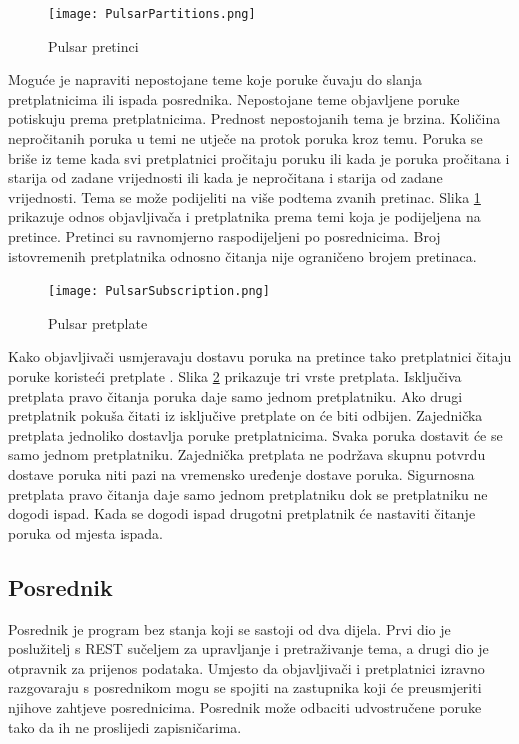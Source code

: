 \documentclass[utf8, diplomski, lmodern, numeric]{fer}
\begin{document}
\begin{figure}[H]
    \centering
    \texttt{[image: PulsarPartitions.png]}
    \caption{Pulsar pretinci}
    \label{fig:pulsar-partitions}
\end{figure}

Moguće je napraviti nepostojane teme \engl{} koje poruke čuvaju do slanja pretplatnicima ili ispada posrednika. Nepostojane teme objavljene poruke potiskuju prema pretplatnicima. Prednost nepostojanih tema je brzina. Količina nepročitanih poruka u temi ne utječe na protok poruka kroz temu. Poruka se briše iz teme kada svi pretplatnici pročitaju poruku ili kada je poruka pročitana i starija od zadane vrijednosti ili kada je nepročitana i starija od zadane vrijednosti. Tema se može podijeliti na više podtema zvanih pretinac. Slika \ref{fig:pulsar-partitions} prikazuje odnos objavljivača i pretplatnika prema temi koja je podijeljena na pretince. Pretinci su ravnomjerno raspodijeljeni po posrednicima. Broj istovremenih pretplatnika odnosno čitanja nije ograničeno brojem pretinaca.

\begin{figure}[H]
    \centering
    \texttt{[image: PulsarSubscription.png]}
    \caption{Pulsar pretplate}
    \label{fig:pulsar-subscription}
\end{figure}

Kako objavljivači usmjeravaju dostavu poruka na pretince tako pretplatnici čitaju poruke koristeći pretplate . Slika \ref{fig:pulsar-subscription} prikazuje tri vrste pretplata. Isključiva pretplata  pravo čitanja poruka daje samo jednom pretplatniku. Ako drugi pretplatnik pokuša čitati iz isključive pretplate on će biti odbijen. Zajednička pretplata  jednoliko dostavlja poruke pretplatnicima. Svaka poruka dostavit će se samo jednom pretplatniku. Zajednička pretplata ne podržava skupnu potvrdu dostave poruka niti pazi na vremensko uređenje dostave poruka. Sigurnosna pretplata \engl{} pravo čitanja daje samo jednom pretplatniku dok se pretplatniku ne dogodi ispad. Kada se dogodi ispad drugotni pretplatnik će nastaviti čitanje poruka od mjesta ispada.

\subsection{Posrednik}
Posrednik je program bez stanja koji se sastoji od dva dijela. Prvi dio je poslužitelj s REST sučeljem za upravljanje i pretraživanje tema, a drugi dio je otpravnik  za prijenos podataka. Umjesto da objavljivači i pretplatnici izravno razgovaraju s posrednikom mogu se spojiti na zastupnika koji će preusmjeriti njihove zahtjeve posrednicima. Posrednik može odbaciti udvostručene poruke tako da ih ne proslijedi zapisničarima.
\end{document}
